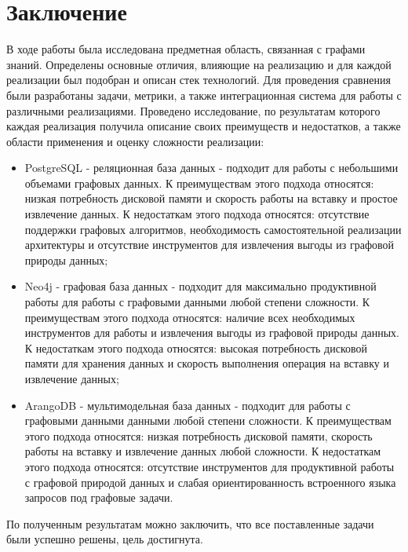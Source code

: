 \chapter*{Заключение}

В ходе работы была исследована предметная область, связанная с графами знаний. Определены основные отличия, влияющие на реализацию и для
каждой реализации был подобран и описан стек технологий. Для проведения сравнения были разработаны задачи, метрики, а также интеграционная
система для работы с различными реализациями. Проведено исследование, по результатам которого каждая реализация получила описание своих
преимуществ и недостатков, а также области применения и оценку сложности реализации:

\begin{itemize}
    \item PostgreSQL - реляционная база данных - подходит для работы с небольшими объемами графовых данных. К преимуществам этого подхода относятся: низкая потребность дисковой памяти и скорость работы на вставку и простое извлечение данных. К недостаткам этого подхода относятся: отсутствие поддержки графовых алгоритмов, необходимость самостоятельной реализации архитектуры и отсутствие инструментов для извлечения выгоды из графовой природы данных;
    \item Neo4j - графовая база данных - подходит для максимально продуктивной работы для работы с графовыми данными любой степени сложности. К преимуществам этого подхода относятся: наличие всех необходимых инструментов для работы и извлечения выгоды из графовой природы данных. К недостаткам этого подхода относятся: высокая потребность дисковой памяти для хранения данных и скорость выполнения операция на вставку и извлечение данных;
    \item ArangoDB - мультимодельная база данных - подходит для работы с графовыми данными данными любой степени сложности. К преимуществам этого подхода относятся: низкая потребность дисковой памяти, скорость работы на вставку и извлечение данных любой сложности. К недостаткам этого подхода относятся: отсутствие инструментов для продуктивной работы с графовой природой данных и слабая ориентированность встроенного языка запросов под графовые задачи.
\end{itemize}

По полученным результатам можно заключить, что все поставленные задачи были успешно решены, цель достигнута.